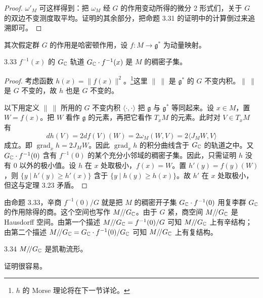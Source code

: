 \begin{proof}
  $\omega'_M$ 可这样得到：把 $\omega_M$ 经 $G$ 的作用变动所得的微分 2 形式们，关于 $G$ 的双边不变测度取平均。证明的其余部分，把命题 3.31 的证明中的计算倒过来追溯即可。
\end{proof}

其次假定群 $G$ 的作用是哈密顿作用，设 $f\colon M\to\mathfrak{g}^*$ 为动量映射。

\begin{proposition*}{3.33}
  $f^{-1}(x)$ 的 $G_{\mathbb{C}}$ 轨道 $G_{\mathbb{C}}\cdot f^{-1}(x)$ 是 $M$ 的稠密子集。
\end{proposition*}

\begin{proof}
  考虑函数 $h(x)=\|f(x)\|^2$。\footnote{$h$ 的 Morse 理论将在下一节详论。}这里 $\|\ \|$ 是 $\mathfrak{g}^*$ 的 $G$ 不变内积。$\|\ \|$ 是 $G$ 不变的，故 $h$ 也是 $G$ 不变的。

  以下用定义 $\|\ \|$ 所用的 $G$ 不变内积 $\langle\cdot,\cdot\rangle$ 把 $\mathfrak{g}$ 与 $\mathfrak{g}^*$ 等同起来。设 $x\in M$，置 $W=f(x)$。把 $W$ 看作 $\mathfrak{g}$ 的元素，再把它看作 $T_xM$
  的元素。此时对 $V\in T_xM$ 有
\[
  dh(V)=2df(V)(W)=2\omega_M(W,V)=2\langle J_MW,V\rangle
\]
成立。即 $\operatorname{grad}_xh=2J_MW$。因此 $\operatorname{grad}_xh$ 的积分曲线含于 $G_{\mathbb{C}}$ 的轨道之中。又 $G_{\mathbb{C}}\cdot f^{-1}(0)$ 含有 $f^{-1}(0)$ 的某个充分小邻域的稠密子集。因此，只需证明 $h$ 没有 0 以外的极小值。设 $h$ 在 $x$ 处取极小，$f(x)=W$。置 $h'(y)=f(y)(W)$，则 $\{y\mid h'(y)\ge h'(x)\}$ 含于 $\{y\mid h(y)\ge h(x)\}$。故 $h'$ 在 $x$ 处取极小，但这与定理 3.23 矛盾。
\end{proof}

由命题 3.33，辛商 $f^{-1}(0)/G$ 就是把 $M$ 的稠密开子集 $G_{\mathbb{C}}\cdot f^{-1}(0)$ 用复李群 $G_{\mathbb{C}}$ 的作用除得的商。这个空间也写作 $M/\!/G_{\mathbb{C}}$。由于 $G$ 紧，商空间 $M/\!/G_{\mathbb{C}}$ 是 Hausdorff 空间。由第一个描述 $M/\!/G_{\mathbb{C}}=f^{-1}(0)/G$ 可知 $M/\!/G_{\mathbb{C}}$ 上有辛结构；由第二个描述 $M/\!/G_{\mathbb{C}}=G_{\mathbb{C}}\cdot f^{-1}(0)/G_{\mathbb{C}}$ 可知 $M/\!/G_{\mathbb{C}}$ 上有复结构。

\begin{lemma}{3.34}
  $M/\!/G_{\mathbb{C}}$ 是凯勒流形。
\end{lemma}

证明很容易。


